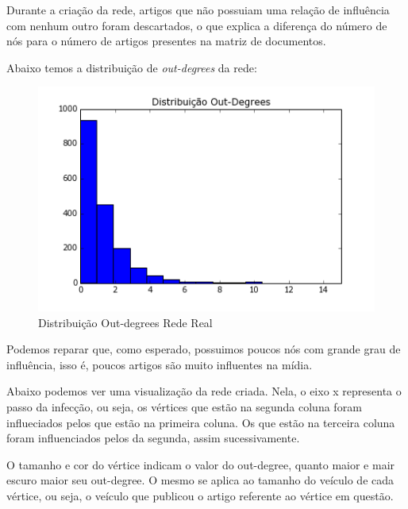 \documentclass[a4paper,12pt]{article}
\begin{document}
Durante a criação da rede, artigos que não possuiam uma relação de influência com nenhum outro foram descartados, o que explica a diferença
do número de nós para o número de artigos presentes na matriz de documentos.

Abaixo temos a distribuição de \textit{out-degrees} da rede:

\begin{figure}[ht]
 \centering
 \includegraphics[scale=0.7]{../Notebook/dist_outs.png}
 \caption{Distribuição Out-degrees Rede Real}
\end{figure}

Podemos reparar que, como esperado, possuimos poucos nós com grande grau de influência, isso é, poucos artigos são muito influentes na
mídia. 

Abaixo podemos ver uma visualização da rede criada. Nela, o eixo x representa o passo da infecção, ou seja, os vértices que estão na 
segunda coluna foram influeciados pelos que estão na primeira coluna. Os que estão na terceira coluna foram influenciados pelos da segunda, 
assim sucessivamente. 

O tamanho e cor do vértice indicam o valor do out-degree, quanto maior e mair escuro maior seu out-degree. O mesmo se aplica ao tamanho
do veículo de cada vértice, ou seja, o veículo que publicou o artigo referente ao vértice em questão.
\end{document}
